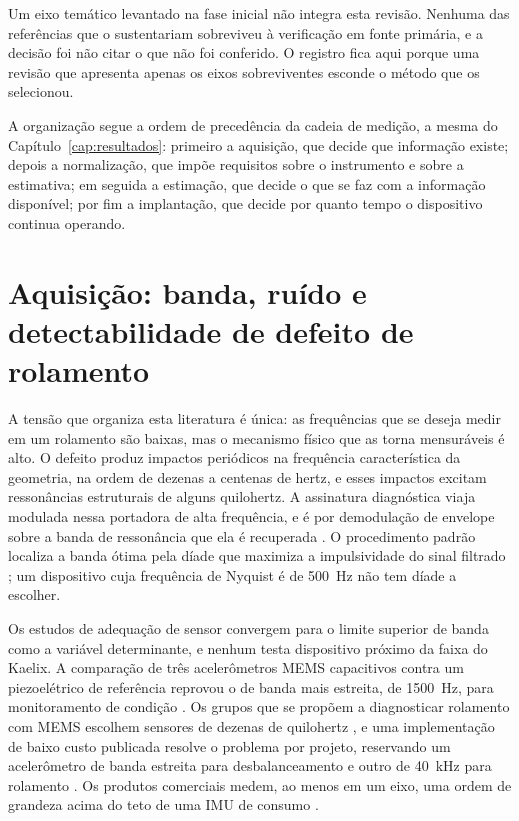 Um eixo temático levantado na fase inicial não integra esta revisão. Nenhuma das
referências que o sustentariam sobreviveu à verificação em fonte primária, e a decisão foi
não citar o que não foi conferido. O registro fica aqui porque uma revisão que apresenta
apenas os eixos sobreviventes esconde o método que os selecionou.

A organização segue a ordem de precedência da cadeia de medição, a mesma do
Capítulo~\ref{cap:resultados}: primeiro a aquisição, que decide que informação existe;
depois a normalização, que impõe requisitos sobre o instrumento e sobre a estimativa; em
seguida a estimação, que decide o que se faz com a informação disponível; por fim a
implantação, que decide por quanto tempo o dispositivo continua operando.

\section{Aquisição: banda, ruído e detectabilidade de defeito de rolamento}
\label{sec:rev-aquisicao}

A tensão que organiza esta literatura é única: as frequências que se deseja medir em um
rolamento são baixas, mas o mecanismo físico que as torna mensuráveis é alto. O defeito
produz impactos periódicos na frequência característica da geometria, na ordem de dezenas
a centenas de hertz, e esses impactos excitam ressonâncias estruturais de alguns
quilohertz. A assinatura diagnóstica viaja modulada nessa portadora de alta frequência, e é
por demodulação de envelope sobre a banda de ressonância que ela é recuperada
\cite{randall2011,antoni2006,antoni2007}. O procedimento padrão localiza a banda ótima pela
díade que maximiza a impulsividade do sinal filtrado \cite{antoni2007}; um dispositivo cuja
frequência de Nyquist é de \SI{500}{\hertz} não tem díade a escolher.

Os estudos de adequação de sensor convergem para o limite superior de banda como a variável
determinante, e nenhum testa dispositivo próximo da faixa do Kaelix. A comparação de três
acelerômetros MEMS capacitivos contra um piezoelétrico de referência reprovou o de banda
mais estreita, de \SI{1500}{\hertz}, para monitoramento de condição \cite{albarbar2008}.
Os grupos que se propõem a diagnosticar rolamento com MEMS escolhem sensores de dezenas de
quilohertz \cite{landi2023,sharma2024}, e uma implementação de baixo custo publicada
resolve o problema por projeto, reservando um acelerômetro de banda estreita para
desbalanceamento e outro de \SI{40}{\kilo\hertz} para rolamento \cite{jakobsen2024}. Os
produtos comerciais medem, ao menos em um eixo, uma ordem de grandeza acima do teto de uma
IMU de consumo \cite{bentlynevada2025,erbessd2025,tractian2022}.

